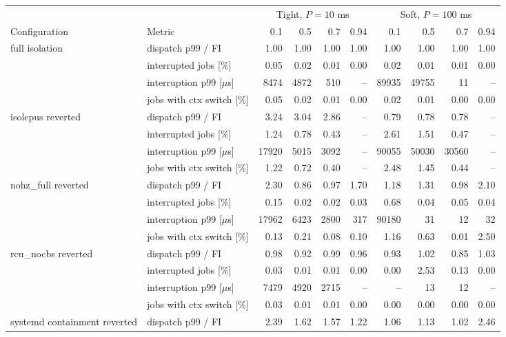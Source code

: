 \begin{longtable}{ll|rrrr|rrrr}
\toprule
 &  & \multicolumn{4}{c}{Tight, $P = 10$ ms} & \multicolumn{4}{c}{Soft, $P = 100$ ms} \\
Configuration & Metric & 0.1 & 0.5 & 0.7 & 0.94 & 0.1 & 0.5 & 0.7 & 0.94 \\
\midrule
\endhead
\multirow[t]{4}{*}{full isolation} & dispatch p99 / FI & 1.00 & 1.00 & 1.00 & 1.00 & 1.00 & 1.00 & 1.00 & 1.00 \\
 & interrupted jobs [\%] & 0.05 & 0.02 & 0.01 & 0.00 & 0.02 & 0.01 & 0.01 & 0.00 \\
 & interruption p99 [$\mu$s] & 8474 & 4872 & 510 & -- & 89935 & 49755 & 11 & -- \\
 & jobs with ctx switch [\%] & 0.05 & 0.02 & 0.01 & 0.00 & 0.02 & 0.01 & 0.00 & 0.00 \\
\cmidrule{1-10}
\multirow[t]{4}{*}{isolcpus reverted} & dispatch p99 / FI & 3.24 & 3.04 & 2.86 & -- & 0.79 & 0.78 & 0.78 & -- \\
 & interrupted jobs [\%] & 1.24 & 0.78 & 0.43 & -- & 2.61 & 1.51 & 0.47 & -- \\
 & interruption p99 [$\mu$s] & 17920 & 5015 & 3092 & -- & 90055 & 50030 & 30560 & -- \\
 & jobs with ctx switch [\%] & 1.22 & 0.72 & 0.40 & -- & 2.48 & 1.45 & 0.44 & -- \\
\cmidrule{1-10}
\multirow[t]{4}{*}{nohz\_full reverted} & dispatch p99 / FI & 2.30 & 0.86 & 0.97 & 1.70 & 1.18 & 1.31 & 0.98 & 2.10 \\
 & interrupted jobs [\%] & 0.15 & 0.02 & 0.02 & 0.03 & 0.68 & 0.04 & 0.05 & 0.04 \\
 & interruption p99 [$\mu$s] & 17962 & 6423 & 2800 & 317 & 90180 & 31 & 12 & 32 \\
 & jobs with ctx switch [\%] & 0.13 & 0.21 & 0.08 & 0.10 & 1.16 & 0.63 & 0.01 & 2.50 \\
\cmidrule{1-10}
\multirow[t]{4}{*}{rcu\_nocbs reverted} & dispatch p99 / FI & 0.98 & 0.92 & 0.99 & 0.96 & 0.93 & 1.02 & 0.85 & 1.03 \\
 & interrupted jobs [\%] & 0.03 & 0.01 & 0.01 & 0.00 & 0.00 & 2.53 & 0.13 & 0.00 \\
 & interruption p99 [$\mu$s] & 7479 & 4920 & 2715 & -- & -- & 13 & 12 & -- \\
 & jobs with ctx switch [\%] & 0.03 & 0.01 & 0.01 & 0.00 & 0.00 & 0.00 & 0.00 & 0.00 \\
\cmidrule{1-10}
\multirow[t]{4}{*}{systemd containment reverted} & dispatch p99 / FI & 2.39 & 1.62 & 1.57 & 1.22 & 1.06 & 1.13 & 1.02 & 2.46 \\

\end{longtable}
